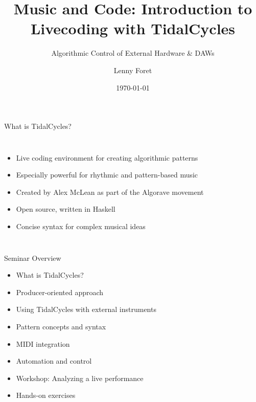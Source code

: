 \documentclass{beamer}
\title{Music and Code: Introduction to Livecoding with TidalCycles}
\subtitle{Algorithmic Control of External Hardware \& DAWs}
\author{Lenny Foret}  %
\institute{Music Technology Workshop for Locust Projects}
\date{\today}
\begin{document}
\begin{frame}
\titlepage
\end{frame}

\begin{frame}{What is TidalCycles?}
\begin{columns}
\begin{itemize}
    \item Live coding environment for creating algorithmic patterns
    \item Especially powerful for rhythmic and pattern-based music
    \item Created by Alex McLean as part of the Algorave movement
    \item Open source, written in Haskell
    \item Concise syntax for complex musical ideas
\end{itemize}

\end{columns}
\end{frame}



\begin{frame}{Seminar Overview}
\begin{itemize}
    \item What is TidalCycles?
    \item Producer-oriented approach
    \item Using TidalCycles with external instruments
    \item Pattern concepts and syntax
    \item MIDI integration
    \item Automation and control
    \item Workshop: Analyzing a live performance
    \item Hands-on exercises
\end{itemize}
\end{frame}


\end{document}
